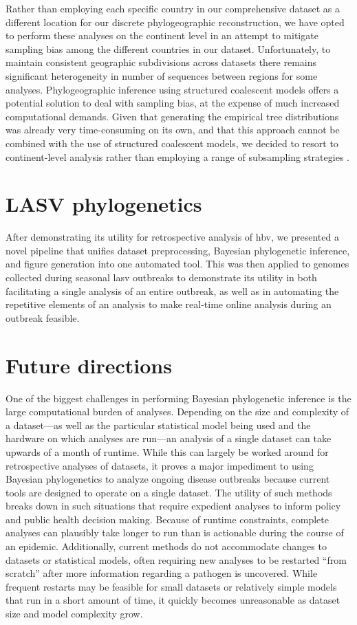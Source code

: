 Rather than employing each specific country in our comprehensive dataset as a different location for our discrete phylogeographic reconstruction, we have opted to perform these analyses on the continent level in an attempt to mitigate sampling bias among the different countries in our dataset.
Unfortunately, to maintain consistent geographic subdivisions across datasets there remains significant heterogeneity in number of sequences between regions for some analyses.
Phylogeographic inference using structured coalescent models \cite{de2015new, muller2018mascot} offers a potential solution to deal with sampling bias, at the expense of much increased computational demands.
Given that generating the empirical tree distributions was already very time-consuming on its own, and that this approach cannot be combined with the use of structured coalescent models, we decided to resort to continent-level analysis rather than employing a range of subsampling strategies \cite{hong2020search}.

\section{LASV phylogenetics}

After demonstrating its utility for retrospective analysis of \gls{hbv}, we presented a novel pipeline that unifies dataset preprocessing, Bayesian phylogenetic inference, and figure generation into one automated tool.
This was then applied to genomes collected during seasonal \gls{lasv} outbreaks to demonstrate its utility in both facilitating a single analysis of an entire outbreak, as well as in automating the repetitive elements of an analysis to make real-time online analysis during an outbreak feasible.

\section{Future directions}

One of the biggest challenges in performing Bayesian phylogenetic inference is the large computational burden of analyses.
Depending on the size and complexity of a dataset---as well as the particular statistical model being used and the hardware on which analyses are run---an analysis of a single dataset can take upwards of a month of runtime.
While this can largely be worked around for retrospective analyses of datasets, it proves a major impediment to using Bayesian phylogenetics to analyze ongoing disease outbreaks because current tools are designed to operate on a single dataset.
The utility of such methods breaks down in such situations that require expedient analyses to inform policy and public health decision making.
Because of runtime constraints, complete analyses can plausibly take longer to run than is actionable during the course of an epidemic.
Additionally, current methods do not accommodate changes to datasets or statistical models, often requiring new analyses to be restarted ``from scratch'' after more information regarding a pathogen is uncovered.
While frequent restarts may be feasible for small datasets or relatively simple models that run in a short amount of time, it quickly becomes unreasonable as dataset size and model complexity grow.

